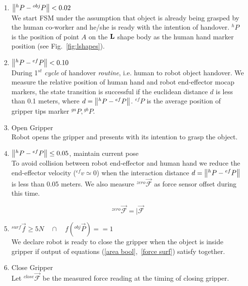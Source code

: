 \begin{enumerate}[start=0,label={\bf{t}\arabic*:}]

    \item $\norm{{}^h{P} - {}^{obj}{P}} < 0.02$\\
    We start FSM under the assumption that object is already being grasped by the human co-worker and he/she is ready with the intention of handover. ${}^h{P}$ is the position of point $A$ on the ${\bf L}$ shape body as the human hand marker position (see Fig.~\ref{fig:lshapes}).
    
    
    \item $\norm{{}^h{P} - {}^{ef}{P}} < 0.10$\\
	During 1$^{st}$ \textit{cycle} of handover \textit{routine}, i.e. human to robot object handover. We measure the relative position of human hand and robot end-effector mocap markers, the state transition is successful if the euclidean distance $d$ is less than 0.1 meters, where $d = \norm{{}^h{P} - {}^{ef}{P}}$. ${}^{ef}{P}$ is the average position of gripper tips marker ${}^{ga}P, {}^{gb}P$. 
    
    \item Open Gripper\\
    Robot opens the gripper and presents with its intention to grasp the object.
    
    \item $\norm{{}^h{P} - {}^{ef}{P}} \leq 0.05$, maintain current pose\\
    To avoid collision between robot end-effector and human hand we reduce the end-effector velocity (${}^{ef}v\simeq0$) when the interaction distance $d = \norm{{}^h{P} - {}^{ef}{P}}$ is less than 0.05 meters. We also measure ${}^{zero}\vec{\mathcal{F}}$ as force sensor offset during this time.

    \begin{equation}\label{Fzero}
        {}^{zero}\vec{\mathcal{F}} = \vert{\vec{\mathcal{F}}}
    \end{equation}

    \item ${}^{surf}\vec{f} \geq 5N \quad \cap \quad f({}^{obj}\vec{P})  == 1$\\
    We declare robot is ready to close the gripper when the object is inside gripper if output of equations (\ref{area bool},~\ref{force surf}) satisfy together.
    
    \item Close Gripper\\
    Let ${}^{close}\vec{\mathcal{F}}$ be the measured force reading at the timing of closing gripper.
        

\end{enumerate}
